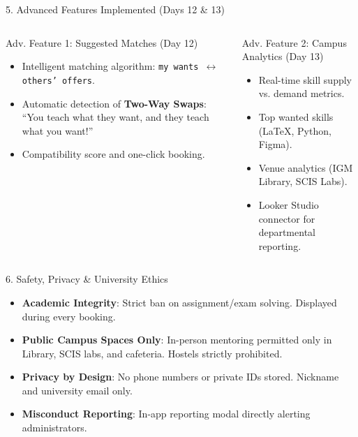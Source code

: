 \documentclass[aspectratio=169,10pt]{beamer}
\begin{document}
\begin{frame}{5. Advanced Features Implemented (Days 12 & 13)}
  \begin{columns}
    \begin{block}{Adv. Feature 1: Suggested Matches (Day 12)}
      \begin{itemize}
        \item Intelligent matching algorithm: \texttt{my wants $\leftrightarrow$ others' offers}.
        \item Automatic detection of \textbf{Two-Way Swaps}: ``You teach what they want, and they teach what you want!''
        \item Compatibility score and one-click booking.
      \end{itemize}
    \end{block}

    \begin{block}{Adv. Feature 2: Campus Analytics (Day 13)}
      \begin{itemize}
        \item Real-time skill supply vs. demand metrics.
        \item Top wanted skills (\LaTeX, Python, Figma).
        \item Venue analytics (IGM Library, SCIS Labs).
        \item Looker Studio connector for departmental reporting.
      \end{itemize}
    \end{block}
  \end{columns}
\end{frame}

\begin{frame}{6. Safety, Privacy \& University Ethics}
  \begin{itemize}
    \item \textbf{Academic Integrity}: Strict ban on assignment/exam solving. Displayed during every booking.
    \item \textbf{Public Campus Spaces Only}: In-person mentoring permitted only in Library, SCIS labs, and cafeteria. Hostels strictly prohibited.
    \item \textbf{Privacy by Design}: No phone numbers or private IDs stored. Nickname and university email only.
    \item \textbf{Misconduct Reporting}: In-app reporting modal directly alerting administrators.
  \end{itemize}
\end{frame}
\end{document}
